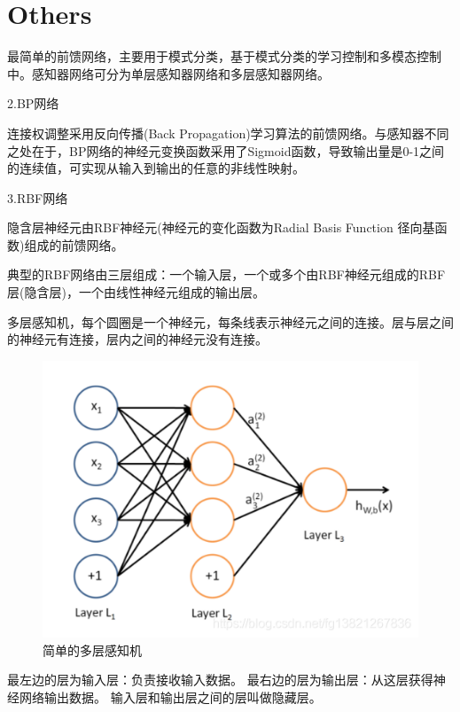 \documentclass[openbib]{article}
\begin{document}
\section{Others}

最简单的前馈网络，主要用于模式分类，基于模式分类的学习控制和多模态控制中。感知器网络可分为单层感知器网络和多层感知器网络。

\begin{center}
	2.BP网络
\end{center}

连接权调整采用反向传播(Back Propagation)学习算法的前馈网络。与感知器不同之处在于，BP网络的神经元变换函数采用了Sigmoid函数，导致输出量是0-1之间的连续值，可实现从输入到输出的任意的非线性映射。

\begin{center}
	3.RBF网络
\end{center}

隐含层神经元由RBF神经元(神经元的变化函数为Radial Basis Function 径向基函数)组成的前馈网络。

典型的RBF网络由三层组成：一个输入层，一个或多个由RBF神经元组成的RBF层(隐含层)，一个由线性神经元组成的输出层。

多层感知机，每个圆圈是一个神经元，每条线表示神经元之间的连接。层与层之间的神经元有连接，层内之间的神经元没有连接。
\begin{figure}[htbp]
	\centering
	\includegraphics[scale=0.4]{多层感知机.png}
	\caption{简单的多层感知机}
\end{figure}

最左边的层为输入层：负责接收输入数据。
最右边的层为输出层：从这层获得神经网络输出数据。
输入层和输出层之间的层叫做隐藏层。
\end{document}
